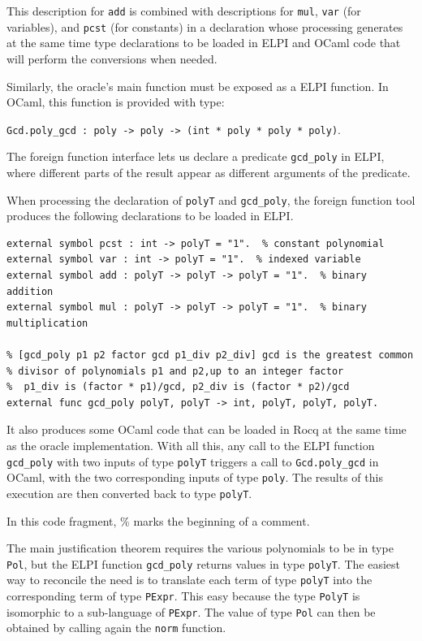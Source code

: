 \documentclass[11pt]{article}
\begin{document}
This description for {\tt add} is combined with descriptions for {\tt mul},
{\tt var} (for variables), and {\tt pcst} (for constants) in a declaration
whose processing generates at the same time type declarations to be loaded
in ELPI and OCaml code that will perform the conversions when needed.

Similarly, the oracle's main function must be exposed as a
ELPI function.  In OCaml, this function is provided with type:
\begin{center}
  \texttt{Gcd.poly\_gcd : poly -> poly -> (int * poly * poly * poly)}.
\end{center}
The foreign function interface lets us declare a predicate {\tt gcd\_poly} in
ELPI, where different parts of the result appear as different arguments of
the predicate.

When processing the declaration of {\tt polyT} and {\tt gcd\_poly}, the
foreign function tool produces the following declarations to be loaded
in ELPI.
\begin{lstlisting}
external symbol pcst : int -> polyT = "1".  % constant polynomial
external symbol var : int -> polyT = "1".  % indexed variable
external symbol add : polyT -> polyT -> polyT = "1".  % binary addition
external symbol mul : polyT -> polyT -> polyT = "1".  % binary multiplication

% [gcd_poly p1 p2 factor gcd p1_div p2_div] gcd is the greatest common
% divisor of polynomials p1 and p2,up to an integer factor 
%  p1_div is (factor * p1)/gcd, p2_div is (factor * p2)/gcd
external func gcd_poly polyT, polyT -> int, polyT, polyT, polyT.
\end{lstlisting}
It also produces some OCaml code that can be loaded in Rocq at the same time
as the oracle implementation.  With all this, any call to the ELPI
function {\tt gcd\_poly} with two inputs of type {\tt polyT} triggers
a call to {\tt Gcd.poly\_gcd} in OCaml, with the two corresponding inputs
of type {\tt poly}.  The results of this execution are then converted back
to type {\tt polyT}.

In this code fragment, \% marks the beginning of a comment.

The main justification theorem requires the various polynomials to be in
type {\tt Pol}, but the ELPI function {\tt gcd\_poly} returns values in
type {\tt polyT}.  The easiest way to reconcile the need is to translate each term of type {\tt polyT} into the corresponding term of type {\tt PExpr}.  This
easy because the type {\tt PolyT} is isomorphic to a sub-language of
{\tt PExpr}.  The value of type {\tt Pol} can then be obtained by calling
again the {\tt norm} function.
\end{document}
